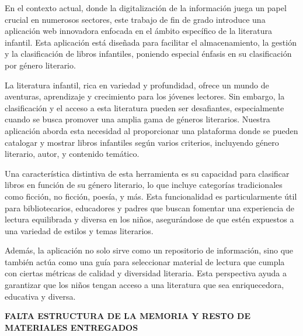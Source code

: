 En el contexto actual, donde la digitalización de la información juega un papel crucial en numerosos sectores, este trabajo de fin de grado introduce una aplicación web innovadora enfocada en el ámbito específico de la literatura infantil. Esta aplicación está diseñada para facilitar el almacenamiento, la gestión y la clasificación de libros infantiles, poniendo especial énfasis en su clasificación por género literario.

La literatura infantil, rica en variedad y profundidad, ofrece un mundo de aventuras, aprendizaje y crecimiento para los jóvenes lectores. Sin embargo, la clasificación y el acceso a esta literatura pueden ser desafiantes, especialmente cuando se busca promover una amplia gama de géneros literarios. Nuestra aplicación aborda esta necesidad al proporcionar una plataforma donde se pueden catalogar y mostrar libros infantiles según varios criterios, incluyendo género literario, autor, y contenido temático.

Una característica distintiva de esta herramienta es su capacidad para clasificar libros en función de su género literario, lo que incluye categorías tradicionales como ficción, no ficción, poesía, y más. Esta funcionalidad es particularmente útil para bibliotecarios, educadores y padres que buscan fomentar una experiencia de lectura equilibrada y diversa en los niños, asegurándose de que estén expuestos a una variedad de estilos y temas literarios.

Además, la aplicación no solo sirve como un repositorio de información, sino que también actúa como una guía para seleccionar material de lectura que cumpla con ciertas métricas de calidad y diversidad literaria. Esta perspectiva ayuda a garantizar que los niños tengan acceso a una literatura que sea enriquecedora, educativa y diversa.



\textbf{FALTA ESTRUCTURA DE LA MEMORIA Y RESTO DE MATERIALES ENTREGADOS}
